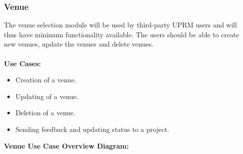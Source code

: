 \subsubsection{Venue}
	The venue selection module will be used by third-party UPRM users and will thus have minimum functionality available. The users should be able to create new venues, update the venues and delete venues.\\ \\
	\textbf{Use Cases:}
	\begin{itemize}
		\item Creation of a venue.
		\item Updating of a venue.
		\item Deletion of a venue.
		\item Sending feedback and updating status to a project.\\
	\end{itemize}
	\textbf{Venue Use Case Overview Diagram:}\\
	\centerline{}	